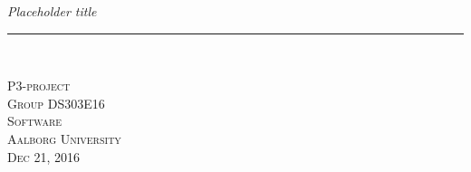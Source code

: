 \thispagestyle{empty}
\begin{center}
\vspace{3cm}

\phantom{hul}

\phantom{hul}

\phantom{hul}

\textsl{\Huge Placeholder title} \\ \vspace{1cm}

\rule{13cm}{3mm} \\ \vspace{1.5cm}
\vspace{1cm}


\vspace{2cm} 
\textsc{\Large P3-project \\
Group DS303E16 \\
Software\\
Aalborg University\\Dec 21, 2016\\}
\end{center}
